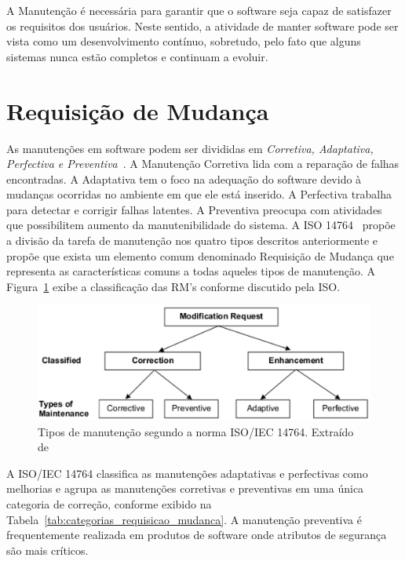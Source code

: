 A Manutenção é necessária para garantir que o software seja capaz de satisfazer
os requisitos dos usuários. Neste sentido, a atividade de manter software pode
ser vista como um desenvolvimento contínuo, sobretudo, pelo fato que alguns
sistemas nunca estão completos e continuam a evoluir.

\section{Requisição de Mudança}
\label{sec:requisição_de_mudanca}

As manutenções em software podem ser divididas em \textit{Corretiva, Adaptativa,
	Perfectiva e Preventiva}~\cite{Lientz:1980:SMM:601062,159342}.  A Manutenção
Corretiva lida com a reparação de falhas encontradas. A Adaptativa tem o foco na
adequação do software devido à mudanças ocorridas no ambiente em que ele está
inserido. A Perfectiva trabalha para detectar e corrigir falhas latentes. A
Preventiva preocupa com atividades que possibilitem aumento da manutenibilidade
do sistema.  A ISO 14764~\cite{1703974} propõe a divisão da tarefa de
manutenção nos quatro tipos descritos anteriormente e propõe que exista um
elemento comum denominado Requisição de Mudança que representa as
características comuns a todas aqueles tipos de manutenção. A
Figura~\ref{fig:modification-request} exibe a classificação das RM's conforme
discutido pela ISO\@.

\begin{figure}[hbtp] \centering \includegraphics[width=.75\textwidth]
	{chapter-intro/img/modification_request.eps} \caption{Tipos de manutenção
		segundo a norma ISO/IEC 14764. Extraído de~\cite{1703974}}
	\label{fig:modification-request} \end{figure}

A ISO/IEC 14764 classifica as manutenções adaptativas e perfectivas como
me\-lho\-ri\-as e agrupa as manutenções corretivas e preventivas em uma única
categoria de correção, conforme exibido na
Tabela~\ref{tab:categorias_requisicao_mudanca}. A manutenção preventiva é 
frequentemente realizada em produtos de software onde atributos de segurança são
mais críticos.

